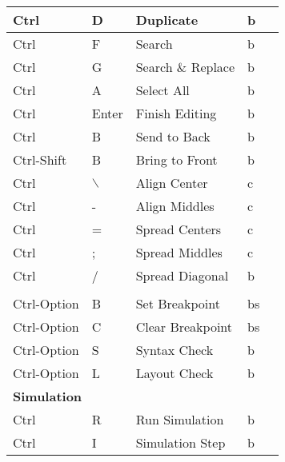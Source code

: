 \begin{longtable}{|l|l|l|l|l|}
Ctrl               & D   & Duplicate                 & b    &                \\ \hline
Ctrl               & F   & Search                    & b    &                \\ \hline
Ctrl               & G   & Search \& Replace         & b    &                \\ \hline
Ctrl               & A   & Select All                & b    &                \\ \hline
Ctrl               & Enter & Finish Editing          & b    &                \\ \hline
Ctrl               & B   & Send to Back              & b    &                \\ \hline
Ctrl-Shift         & B   & Bring to Front            & b    &                \\ \hline
Ctrl               & $\backslash$   & Align Center   & c    &                \\ \hline
Ctrl               & -   & Align Middles             & c    &                \\ \hline
Ctrl               & =   & Spread Centers            & c    &                \\ \hline
Ctrl               & ;   & Spread Middles            & c    &                \\ \hline
Ctrl               & /   & Spread Diagonal           & b    &                \\ \hline
%
\newpage
%
\hline
\multicolumn{5}{|l|}{\textbf{Net}}                                    \\ \hline
Ctrl-Option  & B   & Set Breakpoint            & bs   &                \\ \hline
Ctrl-Option  & C   & Clear Breakpoint          & bs   &                \\ \hline
Ctrl-Option  & S   & Syntax Check              & b    &                \\ \hline
Ctrl-Option  & L   & Layout Check              & b    &                \\ \hline
\multicolumn{5}{|l|}{\textbf{Simulation}}                             \\ \hline
Ctrl         & R   & Run Simulation            & b    &                \\ \hline
Ctrl         & I   & Simulation Step           & b    &                \\ \hline

\end{longtable}
